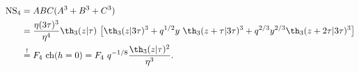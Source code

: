 \begin{equation} 
  \begin{split}
{\rm NS}_4 &= ABC(A^3 + B^3 + C^3) \\
&=  {\eta(3\tau)^3
  \over \eta^4}  \th_3(z|\tau) ~\big[ \th_3(z|3\tau)^3 + q^{1/2} y~
\th_3(z+\tau|3\tau)^3  + q^{2/3} y^{2/3} \th_3(z+2\tau|3\tau)^3 \big]\\
& \stackrel{!}{=} F_4~ {\rm ch}(h=0) = F_4~q^{-1/8} {\th_3(z|\tau)^2
  \over \eta^3} .     
  \end{split}
\end{equation}

